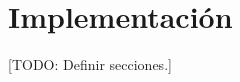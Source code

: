 \documentclass{subfiles}
\begin{document}
  \chapter{Implementación}
  \label{chap:implementation}

    [TODO: Definir secciones.]
\end{document}
